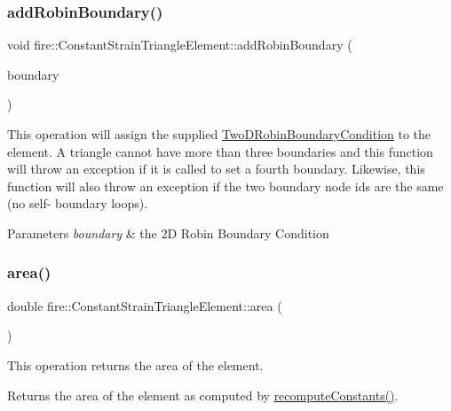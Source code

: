\subsubsection{\texorpdfstring{add\+Robin\+Boundary()}{addRobinBoundary()}}
{\footnotesize\ttfamily void fire\+::\+Constant\+Strain\+Triangle\+Element\+::add\+Robin\+Boundary (\begin{DoxyParamCaption}\item[{const \hyperlink{a00789}{Two\+D\+Robin\+Boundary\+Condition} \&}]{boundary }\end{DoxyParamCaption})}

This operation will assign the supplied \hyperlink{a00789}{Two\+D\+Robin\+Boundary\+Condition} to the element. A triangle cannot have more than three boundaries and this function will throw an exception if it is called to set a fourth boundary. Likewise, this function will also throw an exception if the two boundary node ids are the same (no self-\/ boundary loops). 
\begin{DoxyParams}{Parameters}
{\em boundary} & the 2D Robin Boundary Condition \\
\hline
\end{DoxyParams}
\mbox{\label{a00773_acd197716c6bffaa3c7b472661f0e5ca4}} 
\subsubsection{\texorpdfstring{area()}{area()}}
{\footnotesize\ttfamily double fire\+::\+Constant\+Strain\+Triangle\+Element\+::area (\begin{DoxyParamCaption}{ }\end{DoxyParamCaption})}

This operation returns the area of the element. \begin{DoxyReturn}{Returns}
the area of the element as computed by \hyperlink{a00773_a40cf9432221b62db76e8b154e3e81e3d}{recompute\+Constants()}. 
\end{DoxyReturn}
\mbox{\label{a00773_ae0795172aa1ee5ffc68ec0e2c4aab9cc}} 
